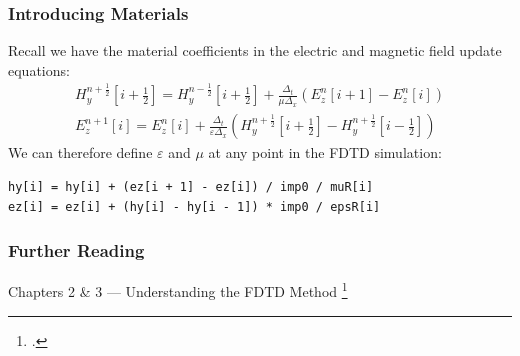 \documentclass[10pt]{beamer}
\newcommand{\E}{\varepsilon}  %
\renewcommand{\u}{\mu}  %
\begin{document}
\begin{frame}[fragile]
    \frametitle{Introducing Materials}
 Recall we have the material coefficients in the electric and magnetic field update equations:
 \begin{align*}
    H_y^{n+\frac{1}{2}}\left[i+\frac{1}{2}\right] = H_y^{n-\frac{1}{2}}\left[i+\frac{1}{2}\right] +
    \frac{\Delta_t}{\u\Delta_x}
    \left(E_z^{n}\left[i+1\right] - E_z^{n}\left[i\right]\right) \\
    E_z^{n+1}\left[i\right] = E_z^{n}\left[i\right] +
    \frac{\Delta_t}{\E\Delta_x}
    \left(H_y^{n+\frac{1}{2}}\left[i+\frac{1}{2}\right] - H_y^{n+\frac{1}{2}}\left[i-\frac{1}{2}\right]\right)
 \end{align*}
    We can therefore define $\E$ and $\u$ at any point in the FDTD simulation:
    \begin{verbatim}
hy[i] = hy[i] + (ez[i + 1] - ez[i]) / imp0 / muR[i]
ez[i] = ez[i] + (hy[i] - hy[i - 1]) * imp0 / epsR[i]
    \end{verbatim}

\end{frame}

\begin{frame}
    \frametitle{Further Reading}

    Chapters 2 \& 3 — Understanding the FDTD Method \footcite{schneider_understanding_nodate}
  


\end{frame}





\end{document}
